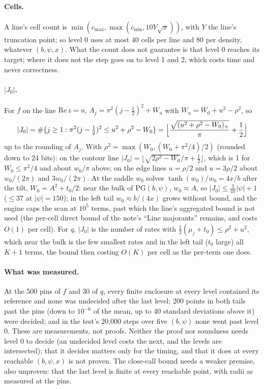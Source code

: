 \documentclass[11pt]{article}
\theoremstyle{definition}
\newcommand{\PG}{\mathrm{PG}}
\begin{document}
\paragraph{Cells.} A line's cell count is $\min(c_{\max},\max(c_{\min},10Y\sqrt x))$, with $Y$ the line's truncation
point; so level 0 uses at most 40 cells per line and 80 per density, whatever $(b,\psi,x)$. What the count does not
guarantee is that level 0 reaches its target; where it does not the step goes on to level 1 and 2, which costs time
and never correctness.

\paragraph{$|J_0|$.} For $f$ on the line $\mathrm{Re}\,z=u$, $A_j=\pi^2(j-\frac12)^2+W_u$ with $W_u=W_0+u^2-\rho^2$,
so
\[
|J_0|=\#\{j\ge1:\pi^2(j-\tfrac12)^2\le u^2+\rho^2-W_0\}=\Bigl\lfloor\frac{\sqrt{(u^2+\rho^2-W_0)_+}}\pi+\frac12
\Bigr\rfloor
\]
up to the rounding of $A_j$. With $\rho^2=\max(W_0,(W_0+\pi^2/4)/2)$ (rounded down to 24 bits): on the contour line
$|J_0|=\lfloor\sqrt{2\rho^2-W_0}/\pi+\frac12\rfloor$, which is 1 for $W_0\le\pi^2/4$ and about $w_0/\pi$ above; on the
edge lines $u=\rho/2$ and $u=3\rho/2$ about $w_0/(2\pi)$ and $3w_0/(2\pi)$. At the saddle $w_0$ solves $\tanh(w_0)/w_0=
4x/b$ after the tilt, $W_0=A^2+t_0/2$: near the bulk of $\PG(b,\psi)$, $w_0\approx A$, so $|J_0|\le\frac3{4\pi}|\psi|+1$
($\le37$ at $|\psi|=150$); in the left tail $w_0\approx b/(4x)$ grows without bound, and the engine caps the scan at
$10^5$ terms, past which the line's aggregated bound is not used (the per-cell direct bound of the note's ``Line
majorants'' remains, and costs $O(1)$ per cell). For $q$, $|J_0|$ is the number of rates with
$\frac12(\mu_j+t_0)\le\rho^2+u^2$, which near the bulk is the few smallest rates and in the left tail ($t_0$ large)
all $K+1$ terms, the bound then costing $O(K)$ per cell as the per-term one does.

\paragraph{What was measured.} At the 500 pins of $f$ and 30 of $q$, every finite enclosure at every level
contained its reference and none was undecided after the last level; 200 points in both tails past the pins (down
to $10^{-6}$ of the mean, up to 40 standard deviations above it) were decided; and in the test's 20{,}000 steps over
five $(b,\psi)$ none went past level 0. These are measurements, not proofs. Neither the proof nor soundness needs
level 0 to decide (an undecided level costs the next, and the levels are intersected); that it decides matters only
for the timing, and that it does at every reachable $(b,\psi,x)$ is not proven. The close-call bound needs a weaker
premise, also unproven: that the last level is finite at every reachable point, with radii as measured at the
pins.
\end{document}

